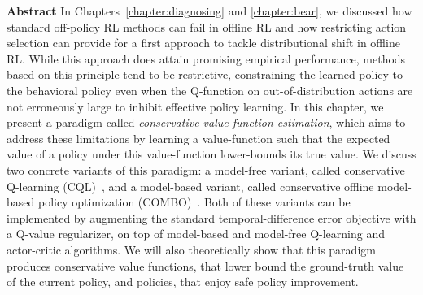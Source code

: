 \documentclass[../thesis.tex]{subfiles}
\begin{document}

\vspace{-0.4cm}
\begin{AIbox}{\large{\textbf{Abstract}}}
\vspace{4mm}
In Chapters~\ref{chapter:diagnosing} and \ref{chapter:bear}, we discussed how standard off-policy RL methods can fail in offline RL and how restricting action selection can provide for a first approach to tackle distributional shift in offline RL. While this approach does attain promising empirical performance, methods based on this principle tend to be restrictive, constraining the learned policy to the behavioral policy even when the Q-function on out-of-distribution actions are not erroneously large to inhibit effective policy learning.                 
In this chapter, we present a paradigm called \emph{conservative value function estimation}, which aims to address these limitations by learning a value-function such that the expected value of a policy under this value-function lower-bounds its true value. We discuss two concrete variants of this paradigm: a model-free variant, called conservative Q-learning (CQL)~\citep{kumar2020conservative}, and a model-based variant, called conservative offline model-based policy optimization (COMBO)~\citep{yu2021conservative}. Both of these variants can be implemented by augmenting the standard temporal-difference error objective with a Q-value regularizer, on top of model-based and model-free Q-learning and actor-critic algorithms. We will also theoretically show that this paradigm produces conservative value functions, that lower bound the ground-truth value of the current policy, and policies, that enjoy safe policy improvement.
\vspace{2mm}
\end{AIbox}
\end{document}
